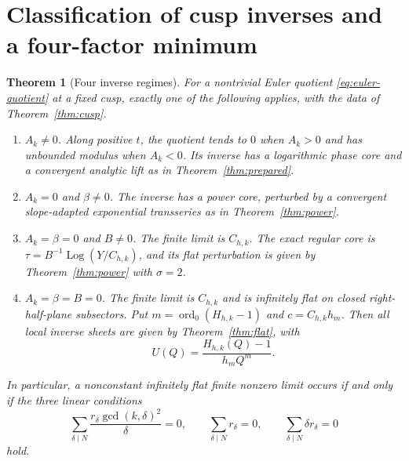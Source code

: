 \documentclass[11pt,a4paper]{article}
\numberwithin{equation}{section}
\newtheorem{theorem}{Theorem}[section]
\theoremstyle{definition}\newtheorem{definition}[theorem]{Definition}
\theoremstyle{remark}\newtheorem{remark}[theorem]{Remark}
\newcommand{\Log}{\operatorname{Log}}\newcommand{\Li}{\operatorname{Li}}
\newcommand{\ord}{\operatorname{ord}}\newcommand{\id}{\operatorname{id}}
\begin{document}
\section{Classification of cusp inverses and a four-factor minimum}
\label{sec:classification}

\begin{theorem}[Four inverse regimes]\label{thm:classification}
For a nontrivial Euler quotient \eqref{eq:euler-quotient} at a fixed cusp,
exactly one of the following applies, with the data of
Theorem~\ref{thm:cusp}.
\begin{enumerate}[label=\textnormal{(\Roman*)},leftmargin=13mm]
\item $A_k\ne0$. Along positive $t$, the quotient tends to $0$ when
$A_k>0$ and has unbounded modulus when $A_k<0$. Its inverse has a
logarithmic phase core and a convergent analytic lift as in
Theorem~\ref{thm:prepared}.
\item $A_k=0$ and $\beta\ne0$. The inverse has a power core, perturbed
by a convergent slope-adapted exponential transseries as in
Theorem~\ref{thm:power}.
\item $A_k=\beta=0$ and $B\ne0$. The finite limit is $C_{h,k}$.
The exact regular core is
$\tau=B^{-1}\Log(Y/C_{h,k})$, and its flat perturbation is given by
Theorem~\ref{thm:power} with $\sigma=2$.
\item $A_k=\beta=B=0$. The finite limit is $C_{h,k}$ and is infinitely
flat on closed right-half-plane subsectors. Put
$m=\ord_0(H_{h,k}-1)$ and
$c=C_{h,k}h_m$. Then all local inverse sheets are given by
Theorem~\ref{thm:flat}, with
\[
 U(Q)=\frac{H_{h,k}(Q)-1}{h_mQ^m}.
\]
\end{enumerate}
In particular, a nonconstant infinitely flat finite nonzero limit occurs
if and only if the three linear conditions
\begin{equation}\label{eq:three-conditions}
 \sum_{\delta\mid N}\frac{r_\delta\gcd(k,\delta)^2}{\delta}=0,
 \qquad \sum_{\delta\mid N}r_\delta=0,
 \qquad \sum_{\delta\mid N}\delta r_\delta=0
\end{equation}
hold.
\end{theorem}
\end{document}
